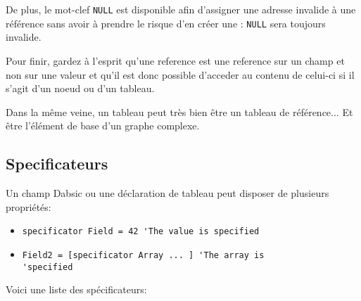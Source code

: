 \documentclass[a5paper, 12pt]{book}
\begin{document}
De plus, le mot-clef \verb!NULL! est disponible afin d'assigner une
adresse invalide à une référence sans avoir à prendre le risque
d'en créer une : \verb!NULL! sera toujours invalide.

Pour finir, gardez à l'esprit qu'une reference est une reference
sur un champ et non sur une valeur et qu'il est donc possible
d'acceder au contenu de celui-ci si il s'agit d'un noeud ou
d'un tableau.

Dans la même veine, un tableau peut très bien être un tableau
de référence... Et être l'élément de base d'un graphe complexe.

\subsection{Specificateurs}

Un champ Dabsic ou une déclaration de tableau peut disposer
de plusieurs propriétés:

\begin{itemize}
  \item \verb!specificator Field = 42 'The value is specified!
  \item \verb!Field2 = [specificator Array ... ] 'The array is!
        \verb!                                   'specified!
\end{itemize}
\vspace{\baselineskip}

Voici une liste des spécificateurs:
\end{document}
